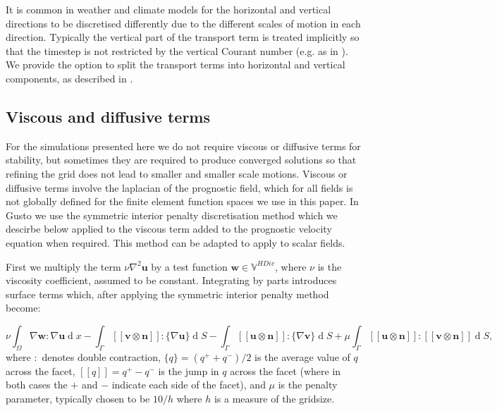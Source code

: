 \documentclass[journal abbreviation, manuscript]{copernicus}
\def\MM#1{\boldsymbol{#1}}
\DeclareMathOperator{\diff}{d}
\newcommand{\avg}[1]{\{#1\}}
\newcommand{\jump}[1]{[\![#1]\!]}
\begin{document}
It is common in weather and climate models for the horizontal and
vertical directions to be discretised differently due to the different
scales of motion in each direction. Typically the vertical part of the
transport term is treated implicitly so that the timestep is not
restricted by the vertical Courant number (e.g. as in
\citet{weller2013runge}). We provide the option to split the transport
terms into horizontal and vertical components, as described in
\citet{brown2025fast}.

\subsection{Viscous and diffusive terms}
\label{sec: diffusion}
For the simulations presented here we do not require viscous or
diffusive terms for stability, but sometimes they are required to
produce converged solutions so that refining the grid does not lead to
smaller and smaller scale motions. Viscous or diffusive terms involve
the laplacian of the prognostic field, which for all fields is not
globally defined for the finite element function spaces we use in this
paper. In Gusto we use the symmetric interior penalty discretisation
method \citep{cockburn2007note} which we descirbe below applied to the
viscous term added to the prognostic velocity equation when
required. This method can be adapted to apply to scalar fields.

First we multiply the term $\nu\nabla^2\MM{u}$ by a test function
$\MM{w}\in\mathbb{V}^{HDiv}$, where $\nu$ is the viscosity
coefficient, assumed to be constant. Integrating by parts introduces
surface terms which, after applying the symmetric interior penalty
method \citep{cockburn2007note} become:

\begin{equation}
 \nu\int_\Omega\nabla\MM{w}:\nabla\MM{u}\diff x - \int_\Gamma\jump{\MM{v}\otimes\MM{n}}:\{\nabla\MM{u}\}\diff S - \int_\Gamma\jump{\MM{u}\otimes\MM{n}}:\{\nabla\MM{v}\}\diff S + \mu\int_\Gamma \jump{\MM{u}\otimes\MM{n}}:\jump{\MM{v}\otimes\MM{n}}\diff S,
\end{equation}
where $:$ denotes double contraction, $\avg{q} = (q^++q^-)/2$ is the
average value of $q$ across the facet, $\jump{q} = q^+-q^-$ is the
jump in $q$ across the facet (where in both cases the $+$ and $-$
indicate each side of the facet), and $\mu$ is the penalty parameter,
typically chosen to be $10/h$ where $h$ is a measure of the gridsize.
\end{document}

